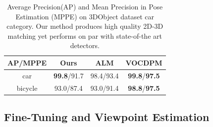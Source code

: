 \documentclass[10pt,twocolumn,letterpaper]{article}
\begin{document}
\begin{table}[!htbp]
  \begin{center}
    \begin{tabular}{|c|c|c|c|}
    \hline
     AP/MPPE& Ours & ALM\cite{Xiang12} & VOCDPM\cite{Pepik12} \\
    \hline\hline
    car & \textbf{99.8}/91.7 &  98.4/93.4 & \textbf{99.8}/\textbf{97.5} \\ 
    bicycle & 93.0/87.4 & 93.0/91.4 & \textbf{98.8}/\textbf{97.5} \\
    \hline
    \end{tabular}
  \end{center}
  \caption{Average Precision(AP) and Mean Precision in Pose Estimation (MPPE) on 3DObject dataset car category. Our method produces high quality 2D-3D matching yet performs on par with state-of-the art detectors.}
  \label{tab:3dobject}
\end{table}


% 

\subsection{Fine-Tuning and Viewpoint Estimation}
\end{document}
